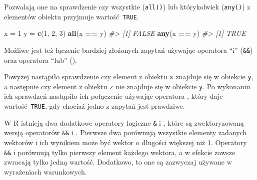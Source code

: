 \documentclass[paper=6in:9in,pagesize=pdftex,headinclude=on,footinclude=on,10pt]{scrbook}
\newenvironment{Shaded}{\begin{snugshade}}{\end{snugshade}}
\newcommand{\CommentTok}[1]{\textcolor[rgb]{0.56,0.35,0.01}{\textit{#1}}}
\newcommand{\DecValTok}[1]{\textcolor[rgb]{0.00,0.00,0.81}{#1}}
\newcommand{\KeywordTok}[1]{\textcolor[rgb]{0.13,0.29,0.53}{\textbf{#1}}}
\newcommand{\NormalTok}[1]{#1}
\newcommand{\OperatorTok}[1]{\textcolor[rgb]{0.81,0.36,0.00}{\textbf{#1}}}
\newcommand{\StringTok}[1]{\textcolor[rgb]{0.31,0.60,0.02}{#1}}
\let\BeginKnitrBlock\begin \let\EndKnitrBlock\end
\begin{document}
Pozwalają one na sprawdzenie czy wszystkie (\texttt{all()}) lub którykolwiek (\texttt{any()}) z elementów obiektu przyjmuje wartość~\texttt{TRUE}.

\begin{Shaded}
\begin{Highlighting}[]
\NormalTok{x =}\StringTok{ }\DecValTok{1}
\NormalTok{y =}\StringTok{ }\KeywordTok{c}\NormalTok{(}\DecValTok{1}\NormalTok{, }\DecValTok{2}\NormalTok{, }\DecValTok{3}\NormalTok{)}
\KeywordTok{all}\NormalTok{(x }\OperatorTok{==}\StringTok{ }\NormalTok{y)}
\CommentTok{#> [1] FALSE}
\KeywordTok{any}\NormalTok{(x }\OperatorTok{==}\StringTok{ }\NormalTok{y)}
\CommentTok{#> [1] TRUE}
\end{Highlighting}
\end{Shaded}

Możliwe jest też łączenie bardziej złożonych zapytań używając operatora ``i'' (\texttt{\&\&}) oraz operatora ``lub'' (\texttt{\textbar{}\textbar{}}).

\begin{Shaded}
\end{Shaded}

Powyżej nastąpiło sprawdzenie czy element z obiektu \texttt{x} znajduje się w obiekcie \texttt{y}, a następnie czy element z obiektu \texttt{z} nie znajduje się w obiekcie \texttt{y}.
Po wykonaniu ich sprawdzeń nastąpiło ich połączenie używając operatora \texttt{\textbar{}\textbar{}}, który daje wartość~\texttt{TRUE}, gdy chociaż jedno z zapytań jest prawdziwe.

\BeginKnitrBlock{rmdinfo}
W R istnieją dwa dodatkowe operatory logiczne \texttt{\&} i \texttt{\textbar{}}, które są zwektoryzowaną wersją operatorów \texttt{\&\&} i \texttt{\textbar{}\textbar{}}.
Pierwsze dwa porównują wszystkie elementy zadanych wektorów i ich wynikiem może być wektor o długości większej niż 1.
Operatory \texttt{\&\&} i \texttt{\textbar{}\textbar{}} porównują tylko pierwszy element każdego wektora, a w efekcie zawsze zwracają tylko jedną wartość.
Dodatkowo, to one są zazwyczaj używane w wyrażeniach warunkowych.
\EndKnitrBlock{rmdinfo}
\end{document}
